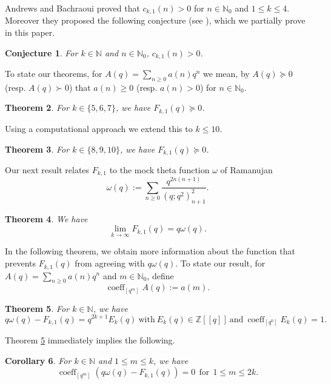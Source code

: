 \documentclass[12pt,reqno]{amsart}
\renewcommand{\o}{{\omega}}
\renewcommand{\(}{\left\(}
\renewcommand{\)}{\right\)}
\numberwithin{equation}{section}
\theoremstyle{plain}
\newtheorem{theorem}{Theorem}[section]
\newtheorem{conjecture}[theorem]{Conjecture}
\newtheorem{corollary}[theorem]{Corollary}
\theoremstyle{definition}
\numberwithin{equation}{section}
\newcommand{\kbf}{\bf\color{green!40!black!60!}}
\begin{document}
Andrews and Bachraoui \cite[(2.2), (2.3), (2.5), Theorem 2.6]{AB} proved that $c_{k,1}(n)>0$ for $n\in \mathbb{N}_0$ and $1\le k\le 4$. Moreover they proposed the following conjecture (see \cite[Conjecture 2.8]{AB}), which we partially prove in this paper. %

\begin{conjecture}\label{ABconj}
	For $k\in \mathbb{N}$ and $n\in \mathbb{N}_0$, $c_{k,1}(n)>0$.	
\end{conjecture}

 To state our theorems, for $A(q)=\sum_{n\ge 0}a(n)q^n$ we mean, by $A(q)\succeq 0$ (resp. $A(q)\succ 0$) that $a(n)\ge 0$ (resp. $a(n)> 0$) for $n\in \mathbb{N}_0$.


\begin{theorem}\label{thm1}
	For $k\in \{5,6,7\}$,  we have $F_{k,1}(q)\succeq 0$.
\end{theorem}

Using a computational approach we extend this to $k \leq 10$.

\begin{theorem}\label{thm2} For $k \in \{8,9,10\}$, we have $F_{k,1}(q) \succeq 0$. \end{theorem}

Our next result relates $F_{k,1}$ to the mock theta function $\omega$ of Ramanujan \cite{AB5}
\begin{equation}\label{Ramanujanomega}
\omega(q):=\sum_{n\ge0}\frac{q^{2n(n+1)}}{\left(q;q^2\right)^2_{n+1}}.
\end{equation}
 \begin{theorem}\label{lem2}
	We have
	\[
	\lim_{k\to\infty} F_{k,1}(q)= q\omega(q).
	\]
\end{theorem}

In the following theorem, we obtain more information about the function that prevents $F_{k,1}(q)$ from agreeing with $q\o(q)$.  To state our result, for $A(q)=\sum_{n\ge 0}a(n)q^n$ and $m\in \mathbb{N}_0$, define
\[
\operatorname{coeff}_{\left[q^m\right]}A(q):=a(m).
\]
\begin{theorem}\label{lem3}
	For $k\in\mathbb{N}$, we have
	\[
	q\omega(q)-F_{k,1}(q)=q^{2k+1}E_k(q)\ \text{with}\ E_k(q)\in \mathbb{Z}[[q]]\ \text{and}\ \operatorname{coeff}_{\left[q^0\right]}E_k(q)=1.
	\]	
\end{theorem}
Theorem \ref{lem3} immediately implies the following.
\begin{corollary}\label{cor1}
	For $k\in\mathbb{N}$ and $1\le m\le k$, we have
	\[
	\operatorname{coeff}_{\left[q^m\right]}\left(q\omega(q)-F_{k,1}(q)\right)=0\ \ \text{for}\ \ 1\le m\le 2k.
	\]
\end{corollary}
\end{document}
